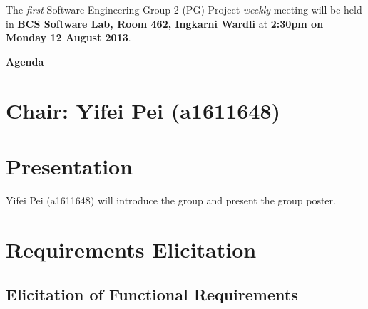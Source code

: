 \documentclass[11pt, a4paper]{article}
\begin{document}
\noindent The {\em first} Software Engineering Group 2 (PG) Project {\em weekly} meeting will be held in {\bf BCS Software Lab, Room 462, Ingkarni Wardli} at {\bf 2:30pm on Monday 12 August 2013}.


\vspace*{15pt}

\begin{center}
\huge \bf Agenda
\end{center}



\section*{Chair: Yifei Pei \large (a1611648)}

\vspace*{15pt}


\section{Presentation}
Yifei Pei (a1611648) will introduce the group and present the group poster.

\section{Requirements Elicitation}

\vspace*{10pt}

\subsection{Elicitation of Functional Requirements}
\end{document}
